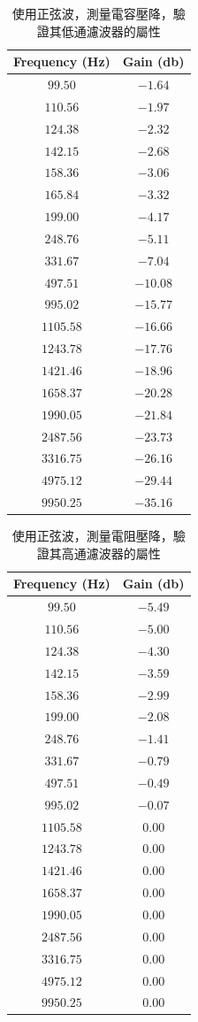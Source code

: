 \begin{table}[htb!]
\centering
\caption{使用正弦波，測量電容壓降，驗證其低通濾波器的屬性}
\begin{tabular}{cc}
\toprule
Frequency (\unit{\Hz}) & Gain (\unit{\decibel}) \\
\midrule
$99.50$ & $-1.64$ \\
$110.56$ & $-1.97$ \\
$124.38$ & $-2.32$ \\
$142.15$ & $-2.68$ \\
$158.36$ & $-3.06$ \\
$165.84$ & $-3.32$ \\
$199.00$ & $-4.17$ \\
$248.76$ & $-5.11$ \\
$331.67$ & $-7.04$ \\
$497.51$ & $-10.08$ \\
$995.02$ & $-15.77$ \\
$1105.58$ & $-16.66$ \\
$1243.78$ & $-17.76$ \\
$1421.46$ & $-18.96$ \\
$1658.37$ & $-20.28$ \\
$1990.05$ & $-21.84$ \\
$2487.56$ & $-23.73$ \\
$3316.75$ & $-26.16$ \\
$4975.12$ & $-29.44$ \\
$9950.25$ & $-35.16$ \\
\bottomrule
\end{tabular}
\end{table}
\begin{table}[htb!]
\centering
\caption{使用正弦波，測量電阻壓降，驗證其高通濾波器的屬性}
\begin{tabular}{cc}
\toprule
Frequency (\unit{\Hz}) & Gain (\unit{\decibel}) \\
\midrule
$99.50$ & $-5.49$ \\
$110.56$ & $-5.00$ \\
$124.38$ & $-4.30$ \\
$142.15$ & $-3.59$ \\
$158.36$ & $-2.99$ \\
$199.00$ & $-2.08$ \\
$248.76$ & $-1.41$ \\
$331.67$ & $-0.79$ \\
$497.51$ & $-0.49$ \\
$995.02$ & $-0.07$ \\
$1105.58$ & $0.00$ \\
$1243.78$ & $0.00$ \\
$1421.46$ & $0.00$ \\
$1658.37$ & $0.00$ \\
$1990.05$ & $0.00$ \\
$2487.56$ & $0.00$ \\
$3316.75$ & $0.00$ \\
$4975.12$ & $0.00$ \\
$9950.25$ & $0.00$ \\
\bottomrule
\end{tabular}
\end{table}
